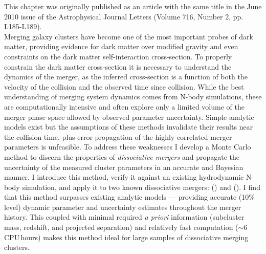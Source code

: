 \label{ch3}

\noindent This chapter was originally published as an article with the same
title in the June 2010 issue of the Astrophysical Journal Letters
(Volume 716, Number 2, pp. L185-L189). \\

Merging galaxy clusters have become one of the most important probes of dark matter, providing evidence for dark matter over modified gravity and even constraints on the dark matter self-interaction cross-section.  
To properly constrain the dark matter cross-section it is necessary to understand the dynamics of the merger, as the inferred cross-section is a function of both the velocity of the collision and the observed time since collision.
While the best understanding of merging system dynamics comes from N-body simulations, these are computationally intensive and often explore only a limited volume of the merger phase space allowed by observed parameter uncertainty.  
Simple analytic models exist but the assumptions of these methods invalidate their results near the collision time, plus error propagation of the highly correlated merger parameters is unfeasible.
To address these weaknesses I develop a Monte Carlo method to discern the properties of \emph{dissociative mergers} and propagate the uncertainty of the measured cluster parameters in an accurate and Bayesian manner.
I introduce this method, verify it against an existing hydrodynamic N-body simulation, and apply it to two known dissociative mergers:  () and  ().
I find that this method surpasses existing analytic models --- providing accurate (10\% level) dynamic parameter and uncertainty estimates throughout the merger history.
This coupled with minimal required \emph{a priori} information (subcluster mass, redshift, and projected separation) and relatively fast computation ($\sim$6 CPU\,hours) makes this method ideal for large samples of dissociative merging clusters.


